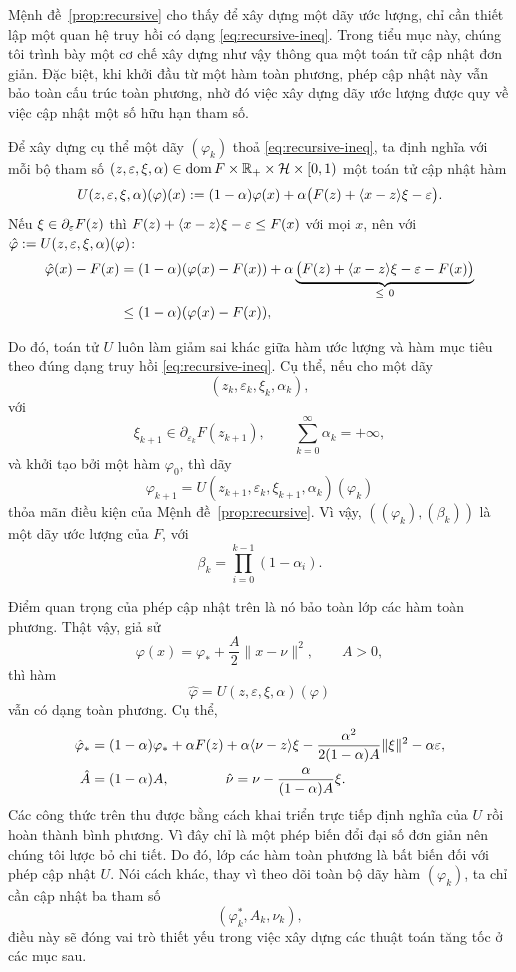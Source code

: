 \begin{essayonly}
Mệnh đề~\ref{prop:recursive} cho thấy để xây dựng một dãy ước lượng, chỉ cần thiết lập một quan hệ truy hồi có dạng \eqref{eq:recursive-ineq}. Trong tiểu mục này, chúng tôi trình bày một cơ chế xây dựng như vậy thông qua một toán tử cập nhật đơn giản. Đặc biệt, khi khởi đầu từ một hàm toàn phương, phép cập nhật này vẫn bảo toàn cấu trúc toàn phương, nhờ đó việc xây dựng dãy ước lượng được quy về việc cập nhật một số hữu hạn tham số.

Để xây dựng cụ thể một dãy $(\varphi_k)$ thoả \eqref{eq:recursive-ineq}, ta định nghĩa với mỗi bộ tham số $(z,\varepsilon,\xi,\alpha)\in\operatorname{dom} F\times\mathbb{R}_+\times\mathcal{H}\times[0,1)$ một toán tử cập nhật hàm
\[
  U(z,\varepsilon,\xi,\alpha)(\varphi)(x)
  := (1-\alpha)\varphi(x) + \alpha\big(F(z)+\langle x-z\rangle{\xi}-\varepsilon\big).
\]
Nếu $\xi\in\partial_\varepsilon F(z)$ thì $F(z)+\langle x-z\rangle{\xi}-\varepsilon \le F(x)$ với mọi $x$, nên với $\hat\varphi := U(z,\varepsilon,\xi,\alpha)(\varphi)$:
\[
  \begin{aligned}
  \hat\varphi(x) - F(x)
  &= (1-\alpha)(\varphi(x)-F(x))
    + \alpha\underbrace{\big(F(z)+\iprod{x-z}{\xi}-\eps-F(x)\big)}_{\le\ 0} \\
  &\le (1-\alpha)(\varphi(x)-F(x)),
  \end{aligned}
\]

Do đó, toán tử $U$ luôn làm giảm sai khác giữa hàm ước lượng và hàm mục tiêu theo đúng dạng truy hồi \eqref{eq:recursive-ineq}. Cụ thể, nếu cho một dãy
\[
(z_k,\varepsilon_k,\xi_k,\alpha_k),
\]
với
\[
\xi_{k+1}\in\partial_{\varepsilon_k}F(z_{k+1}),
\qquad
\sum_{k=0}^{\infty}\alpha_k=+\infty,
\]
và khởi tạo bởi một hàm $\varphi_0$, thì dãy
\[
\varphi_{k+1}
=
U(z_{k+1},\varepsilon_k,\xi_{k+1},\alpha_k)(\varphi_k)
\]
thỏa mãn điều kiện của Mệnh đề~\ref{prop:recursive}. Vì vậy, $((\varphi_k),(\beta_k))$ là một dãy ước lượng của $F$, với
\[
\beta_k=\prod_{i=0}^{k-1}(1-\alpha_i).
\]

Điểm quan trọng của phép cập nhật trên là nó bảo toàn lớp các hàm toàn phương. Thật vậy, giả sử
\[
\varphi(x)
=
\varphi_*
+\frac A2\|x-\nu\|^2,
\qquad
A>0,
\]
thì hàm
\[
\hat\varphi
=
U(z,\varepsilon,\xi,\alpha)(\varphi)
\]
vẫn có dạng toàn phương. Cụ thể,
\begin{equation}
  \begin{aligned}
  \hat\varphi_* &= (1-\alpha)\varphi_* + \alpha F(z) + \alpha\langle\nu-z\rangle{\xi}
    - \frac{\alpha^2}{2(1-\alpha)A}\lVert\xi\rVert^2 - \alpha\varepsilon, \\
  \hat A &= (1-\alpha)A,
  \qquad\qquad
  \hat\nu = \nu - \frac{\alpha}{(1-\alpha)A}\xi.
  \end{aligned}
  \label{eq:quad-update}
\end{equation}
Các công thức trên thu được bằng cách khai triển trực tiếp định nghĩa của $U$ rồi hoàn thành bình phương. Vì đây chỉ là một phép biến đổi đại số đơn giản nên chúng tôi lược bỏ chi tiết.
Do đó, lớp các hàm toàn phương là bất biến đối với phép cập nhật $U$. Nói cách khác, thay vì theo dõi toàn bộ dãy hàm $(\varphi_k)$, ta chỉ cần cập nhật ba tham số
\[
(\varphi_k^*,A_k,\nu_k),
\]
điều này sẽ đóng vai trò thiết yếu trong việc xây dựng các thuật toán tăng tốc ở các mục sau.
\end{essayonly}

